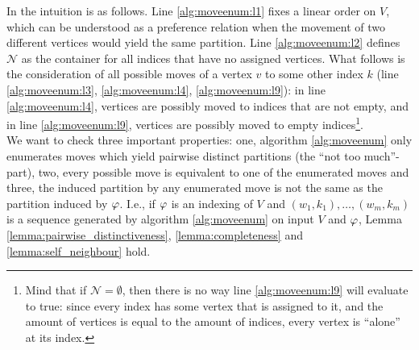 In the intuition is as follows. Line \ref{alg:moveenum:l1} fixes a linear order on $V$, which can be understood as a preference relation when the movement of two different vertices would yield the same partition. Line \ref{alg:moveenum:l2} defines $\mathcal{N}$ as the container for all indices that have no assigned vertices. What follows is the consideration of all possible moves of a vertex $v$ to some other index $k$ (line \ref{alg:moveenum:l3}, \ref{alg:moveenum:l4}, \ref{alg:moveenum:l9}): in line \ref{alg:moveenum:l4}, vertices are possibly moved to indices that are not empty, and in line \ref{alg:moveenum:l9}, vertices are possibly moved to empty indices\footnote{Mind that if $\mathcal{N} = \emptyset$, then there is no way line \ref{alg:moveenum:l9} will evaluate to true: since every index has some vertex that is assigned to it, and the amount of vertices is equal to the amount of indices, every vertex is ``alone'' at its index.}.\\
We want to check three important properties: one, algorithm \ref{alg:moveenum} only enumerates moves which yield pairwise distinct partitions (the ``not too much''-part), two, every possible move is equivalent to one of the enumerated moves and three, the induced partition by any enumerated move is not the same as the partition induced by $\varphi$. I.e., if $\varphi$ is an indexing of $V$ and $(w_1,k_1),\dots,(w_m,k_m)$ is a sequence generated by algorithm \ref{alg:moveenum} on input $V$ and $\varphi$, Lemma \ref{lemma:pairwise_distinctiveness}, \ref{lemma:completeness} and \ref{lemma:self_neighbour} hold.


